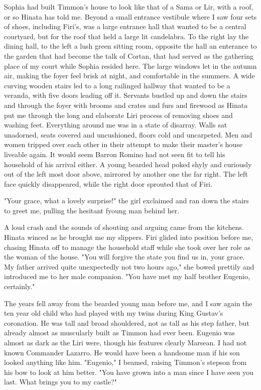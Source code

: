 \documentclass{article}
\begin{document}
Sophia had built Timmon's house to look like that of a Sama or Lir, with a roof, or so Hinata has told me. Beyond a small entrance vestibule where I saw four sets of shoes, including Firi's, was a large entrance hall that wanted to be a central courtyard, but for the roof that held a large lit candelabra. To the right lay the dining hall, to the left a lush green sitting room, opposite the hall an enterance to the garden that had become the talk of Cortan, that had served as the gathering place of my court while Sophia resided here. The large windows let in the autumn air, making the foyer feel brisk at night, and comfortable in the summers. A wide curving wooden stairs led to a long railinged hallway that wanted to be a veranda, with five doors leading off it. Servants bustled up and down the stairs and through the foyer with brooms and crates and furs and firewood as Hinata put me through the long and elaborate Liri process of removing shoes and washing feet. Everything around me was in a state of disarray. Walls sat unadorned, seats covered and uncushioned, floors cold and uncarpeted. Men and women tripped over each other in their attempt to make their master's house liveable again. It would seem Barron Romino had not seen fit to tell his household of his arrival either. A young bearded head poked shyly and curiously out of the left most door above, mirrored by another one the far right. The left face quickly disappeared, while the right door sprouted that of Firi. 

"Your grace, what a lovely surprise!" the girl exclaimed and ran down the stairs to greet me, pulling the hesitant fyoung man behind her. 

A loud crash and the sounds of shouting and arguing came from the kitchens. Hinata winced as he brought me my slippers. Firi glided into position before me, chasing Hinata off to manage the household staff while she took over her role as the woman of the house. "You will forgive the state you find us in, your grace. My father arrived quite unexpectedly not two hours ago," she bowed prettily and introduced me to her male companion. "You have met my half brother Eugenio, certainly." 

The years fell away from the bearded young man before me, and I saw again the ten year old child who had played with my twins during King Gustav's coronation. He was tall and broad shouldered, not as tall as his step father, but already almost as muscularly built as Timmon had ever been. Eugenio was almost as dark as the Liri were, though his features clearly Marsean. I had not known Commander Lazarro. He would have been a handsome man if his son looked anything like him. "Eugenio," I beamed, raising Timmon's stepson from his bow to look at him better. "You have grown into a man since I have seen you last. What brings you to my castle?"
\end{document}
